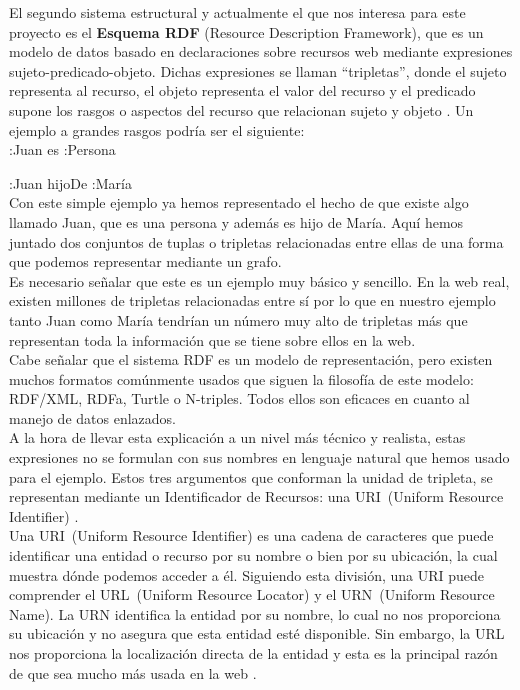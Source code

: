 El segundo sistema estructural y actualmente el que nos interesa para este proyecto es el \textbf{Esquema RDF} (Resource Description Framework), que es un modelo de datos basado en declaraciones sobre recursos web mediante expresiones sujeto-predicado-objeto. Dichas expresiones se llaman ``tripletas'', donde el sujeto representa al recurso, el objeto representa el valor del recurso y el predicado supone los rasgos o aspectos del recurso que relacionan sujeto y objeto \cite{sakr2018}. Un ejemplo a grandes rasgos podría ser el siguiente:\\

:Juan es :Persona

:Juan hijoDe :María\\

Con este simple ejemplo ya hemos representado el hecho de que existe algo llamado Juan, que es una persona y además es hijo de María. Aquí hemos juntado dos conjuntos de tuplas o tripletas relacionadas entre ellas de una forma que podemos representar mediante un grafo.\\

Es necesario señalar que este es un ejemplo muy básico y sencillo. En la web real, existen millones de tripletas relacionadas entre sí por lo que en nuestro ejemplo tanto Juan como María tendrían un número muy alto de tripletas más que representan toda la información que se tiene sobre ellos en la web.\\

Cabe señalar que el sistema RDF es un modelo de representación, pero existen muchos formatos comúnmente usados que siguen la filosofía de este modelo: RDF/XML, RDFa, Turtle o N-triples. Todos ellos son eficaces en cuanto al manejo de datos enlazados.\\

A la hora de llevar esta explicación a un nivel más técnico y realista, estas expresiones no se formulan con sus nombres en lenguaje natural que hemos usado para el ejemplo. Estos tres argumentos que conforman la unidad de tripleta, se representan mediante un Identificador de Recursos: una URI~(Uniform Resource Identifier) \cite{sakr2018,berners2007}.\\

Una URI~(Uniform Resource Identifier) es una cadena de caracteres que puede identificar una entidad o recurso por su nombre o bien por su ubicación, la cual muestra dónde podemos acceder a él. Siguiendo esta división, una URI puede comprender el URL~(Uniform Resource Locator) y el URN~(Uniform Resource Name). La URN identifica la entidad por su nombre, lo cual no nos proporciona su ubicación y no asegura que esta entidad esté disponible. Sin embargo, la URL nos proporciona la localización directa de la entidad y esta es la principal razón de que sea mucho más usada en la web \cite{berners1994,saint2017,sakr2018}.\\

